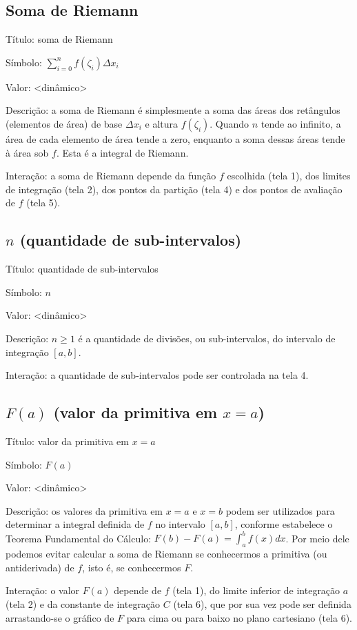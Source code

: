 \documentclass[a4paper,10pt]{scrartcl}
\begin{document}
  \subsection*{Soma de Riemann}
    \begin{compactdesc}
	\item{Título:} soma de Riemann
	\item{Símbolo:} $\sum_{i=0}^{n} f(\zeta_i) \Delta x_i$
	\item{Valor:} <dinâmico>
	\item{Descrição:} a soma de Riemann é simplesmente a soma das áreas dos retângulos (elementos de área) de base $\Delta x_i$ e altura $f(\zeta_i)$. Quando $n$ tende ao infinito, a área de cada elemento de área tende a zero, enquanto a soma dessas áreas tende à área sob $f$. Esta é a integral de Riemann.
	\item{Interação:} a soma de Riemann depende da função $f$ escolhida (tela 1), dos limites de integração (tela 2), dos pontos da partição (tela 4) e dos pontos de avaliação de $f$ (tela 5).
    \end{compactdesc}
	
  \subsection*{$n$ (quantidade de sub-intervalos)}
    \begin{compactdesc}
	\item{Título:} quantidade de sub-intervalos
	\item{Símbolo:} $n$
	\item{Valor:} <dinâmico>
	\item{Descrição:} $n \ge 1$ é a quantidade de divisões, ou sub-intervalos, do intervalo de integração $[a,b]$.
	\item{Interação:} a quantidade de sub-intervalos pode ser controlada na tela 4.
    \end{compactdesc}
	
  \subsection*{$F(a)$ (valor da primitiva em $x=a$)}
    \begin{compactdesc}
	\item{Título:} valor da primitiva em $x = a$
	\item{Símbolo:} $F(a)$
	\item{Valor:} <dinâmico>
	\item{Descrição:} os valores da primitiva em $x = a$ e $x = b$ podem ser utilizados para determinar a integral definida de $f$ no intervalo $[a,b]$, conforme estabelece o Teorema Fundamental do Cálculo: $F(b)-F(a) = \int_a^b f(x) dx$. Por meio dele podemos evitar calcular a soma de Riemann se conhecermos a primitiva (ou antiderivada) de $f$, isto é, se conhecermos $F$.
	\item{Interação:} o valor $F(a)$ depende de $f$ (tela 1), do limite inferior de integração $a$ (tela 2) e da constante de integração $C$ (tela 6), que por sua vez pode ser definida arrastando-se o gráfico de $F$ para cima ou para baixo no plano cartesiano (tela 6).
    \end{compactdesc}
	
\end{document}
